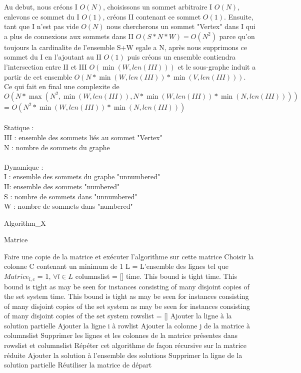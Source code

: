 \documentclass{article}
\begin{document}
\cite{Algo2} Au debut, nous créons I $O(N)$, choisissons un sommet 
arbitraire I $O(N)$, enlevons ce sommet du I $O(1)$,
créons II contenant ce sommet $O(1)$.
Ensuite, tant que I n'est pas vide $O(N)$ nous chercherons
un sommet "Vertex" dans I qui a plus de connexions aux sommets 
dans II $O(S * N * W) = O(N^2)$ parce qu'on toujours la cardinalite 
de l'ensemble {S+W} egale a N, après nous supprimons ce sommet du I en 
l'ajoutant au II $O(1)$ puis créons un ensemble contiendra 
l'intersection entre II et III $O(\min(W,len(III)))$ et le 
sous-graphe induit a partir de cet ensemble $O(N*\min(W,len(III))*\min(V,len(III)))$.
Ce qui fait en final une complexite de
$O(N*\max(N^2,\min(W,len(III)),N*\min(W,len(III))*\min(N,len(III))))$
= $O(N^2*\min(W,len(III))*\min(N,len(III)))$\\\\
Statique :\\
III : ensemble des sommets liés au sommet "Vertex"\\
N : nombre de sommets du graphe\\\\
Dynamique :\\
I : ensemble des sommets du graphe "unnumbered"\\
II: ensemble des sommets "numbered"\\
S : nombre de sommets dans "unnumbered"\\
W : nombre de sommets dans "numbered"
		
		\begin{algorithm}[H]
		\caption{Algorithm\_X}
		\begin{algorithmic}[1]
		\REQUIRE Matrice
		
		\STATE Faire une copie de la matrice et exécuter l'algorithme sur cette matrice		
		\STATE Choisir la colonne C contenant un minimum de 1
		\STATE L = L'ensemble des lignes tel que $Matrice_{l,c}$ = 1, $\forall l \in L$
			\STATE columnslist = [] time. This bound is tight  time. This bound is tight as may be seen for instances consisting of many disjoint copies of the set system  time. This bound is tight as may be seen for instances consisting of many disjoint copies of the set system as may be seen for instances consisting of many disjoint copies of the set system 
			\STATE rowslist = []
			\STATE Ajouter la ligne à la solution partielle
							\STATE Ajouter la ligne i à rowlist
						\ENDIF									
					\ENDFOR
					\STATE Ajouter la colonne j de la matrice à columnslist	
				\ENDIF
			\ENDFOR
		\STATE Supprimer les lignes et les colonnes de la matrice présentes dans rowslist et columnslist
				\STATE Répéter cet algorithme de façon récursive sur la matrice réduite
			\ENDIF			
		\ELSE
			\STATE Ajouter la solution à l'ensemble des solutions
		\ENDIF 
		\STATE Supprimer la ligne de la solution partielle
		\STATE Réutiliser la matrice de départ
		\ENDFOR
	
		\end{algorithmic}
		\end{algorithm}
		
\end{document}
